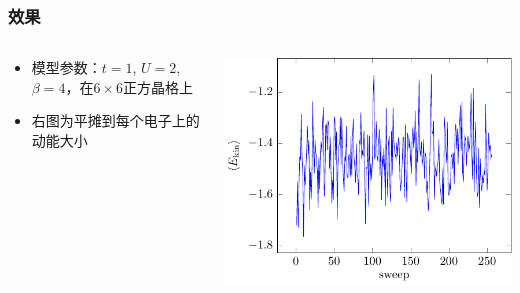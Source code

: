 \documentclass[UTF8]{ctexbeamer}
\begin{document}
\begin{frame}
\frametitle{效果}

\begin{columns}

\begin{column}{0.4\textwidth}
    \begin{itemize}
        \item 模型参数：$t=1$, $U=2$, $\beta=4$，在$6 \times 6$正方晶格上
        \item 右图为平摊到每个电子上的动能大小
    \end{itemize}
\end{column}

\begin{column}{0.6\textwidth}
    \includegraphics[width=\textwidth]{heat-up-T.pdf}
\end{column}

\end{columns}

\end{frame}
\end{document}
